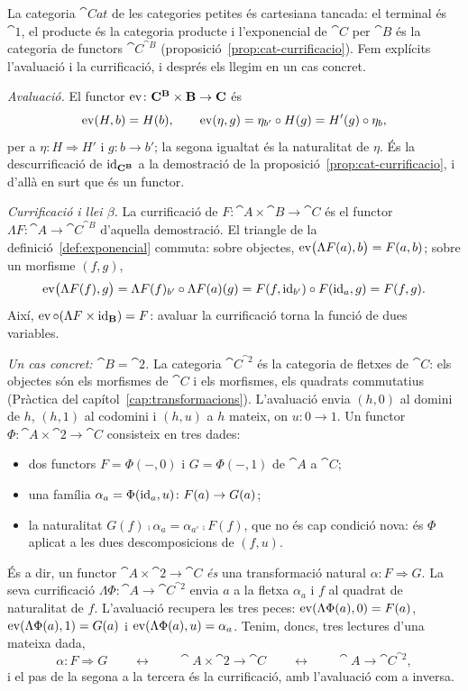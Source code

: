 \begin{exemple}\label{ex:cat-ccc}
La categoria $\cat{Cat}$ de les categories petites és cartesiana tancada: el terminal és $\cat{1}$, el producte és la categoria producte i l'exponencial de $\cat{C}$ per $\cat{B}$ és la categoria de functors $\cat{C}^{\cat{B}}$ (proposició~\ref{prop:cat-currificacio}). Fem explícits l'avaluació i la currificació, i després els llegim en un cas concret.

\emph{Avaluació.} El functor $\operatorname{ev}\colon\mathbf{C}^{\mathbf{B}}\times\mathbf{B}\to\mathbf{C}$ és
\[
\operatorname{ev}(H,b)=H(b),\qquad \operatorname{ev}(\eta,g)=\eta_{b'}\circ H(g)=H'(g)\circ\eta_b,
\]
per a $\eta\colon H\Rightarrow H'$ i $g\colon b\to b'$; la segona igualtat és la naturalitat de $\eta$. És la descurrificació de $\operatorname{id}_{\mathbf{C}^{\mathbf{B}}}$ a la demostració de la proposició~\ref{prop:cat-currificacio}, i d'allà en surt que és un functor.

\emph{Currificació i llei $\beta$.} La currificació de $F\colon\cat{A}\times\cat{B}\to\cat{C}$ és el functor $\Lambda F\colon\cat{A}\to\cat{C}^{\cat{B}}$ d'aquella demostració. El triangle de la definició~\ref{def:exponencial} commuta: sobre objectes, $\operatorname{ev}\bigl(\Lambda F(a),b\bigr)=F(a,b)$; sobre un morfisme $(f,g)$,
\[
\operatorname{ev}\bigl(\Lambda F(f),g\bigr)=\Lambda F(f)_{b'}\circ\Lambda F(a)(g)=F(f,\operatorname{id}_{b'})\circ F(\operatorname{id}_a,g)=F(f,g).
\]
Així, $\operatorname{ev}\circ(\Lambda F\times\operatorname{id}_{\mathbf{B}})=F$: avaluar la currificació torna la funció de dues variables.

\emph{Un cas concret: $\cat{B}=\cat{2}$.} La categoria $\cat{C}^{\cat{2}}$ és la categoria de fletxes de $\cat{C}$: els objectes són els morfismes de $\cat{C}$ i els morfismes, els quadrats commutatius (Pràctica del capítol~\ref{cap:transformacions}). L'avaluació envia $(h,0)$ al domini de $h$, $(h,1)$ al codomini i $(h,u)$ a $h$ mateix, on $u\colon0\to1$. Un functor $\Phi\colon\cat{A}\times\cat{2}\to\cat{C}$ consisteix en tres dades:
\begin{itemize}
\item dos functors $F=\Phi(-,0)$ i $G=\Phi(-,1)$ de $\cat{A}$ a $\cat{C}$;
\item una família $\alpha_a=\Phi(\operatorname{id}_a,u)\colon F(a)\to G(a)$;
\item la naturalitat $G(f)\comp\alpha_a=\alpha_{a'}\comp F(f)$, que no és cap condició nova: és $\Phi$ aplicat a les dues descomposicions de $(f,u)$.
\end{itemize}
És a dir, un functor $\cat{A}\times\cat{2}\to\cat{C}$ \emph{és} una transformació natural $\alpha\colon F\Rightarrow G$. La seva currificació $\Lambda\Phi\colon\cat{A}\to\cat{C}^{\cat{2}}$ envia $a$ a la fletxa $\alpha_a$ i $f$ al quadrat de naturalitat de $f$. L'avaluació recupera les tres peces: $\operatorname{ev}(\Lambda\Phi(a),0)=F(a)$, $\operatorname{ev}(\Lambda\Phi(a),1)=G(a)$ i $\operatorname{ev}(\Lambda\Phi(a),u)=\alpha_a$. Tenim, doncs, tres lectures d'una mateixa dada,
\[
\alpha\colon F\Rightarrow G\qquad\longleftrightarrow\qquad\cat{A}\times\cat{2}\to\cat{C}\qquad\longleftrightarrow\qquad\cat{A}\to\cat{C}^{\cat{2}},
\]
i el pas de la segona a la tercera és la currificació, amb l'avaluació com a inversa.
\end{exemple}

